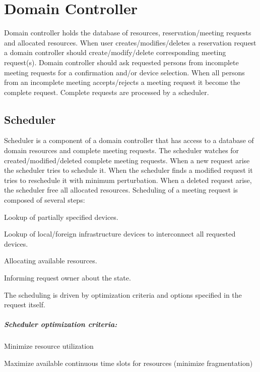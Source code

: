 \chapter{Domain Controller}

Domain controller holds the database of resources, reservation/meeting requests 
and allocated resources. When user creates/modifies/deletes a reservation 
request a domain controller should create/modify/delete corresponding meeting 
request(s). Domain controller should ask requested persons from incomplete 
meeting requests for a confirmation and/or device selection. When all persons 
from an incomplete meeting accepts/rejects a meeting request it become the
complete request. Complete requests are processed by a scheduler.

\section{Scheduler}

Scheduler is a component of a domain controller that has access to a database 
of domain resources and complete meeting requests. The scheduler watches for
created/modified/deleted complete meeting requests. When a new request arise
the scheduler tries to schedule it. When the scheduler finds a modified request
it tries to reschedule it with minimum perturbation. When 
a deleted request arise, the scheduler free all allocated resources. Scheduling of a meeting request is composed of several steps:
\begin{compactenum}
\item Lookup of partially specified devices.
\item Lookup of local/foreign infrastructure devices to interconnect all requested devices.
\item Allocating available resources.
\item Informing request owner about the state.
\end{compactenum}
The scheduling is driven by optimization criteria and options specified in the request itself.


\paragraph{Scheduler optimization criteria:}
\begin{compactitem}
\item Minimize resource utilization
\item Maximize available continuous time slots for resources (minimize 
  fragmentation)
\end{compactitem}

